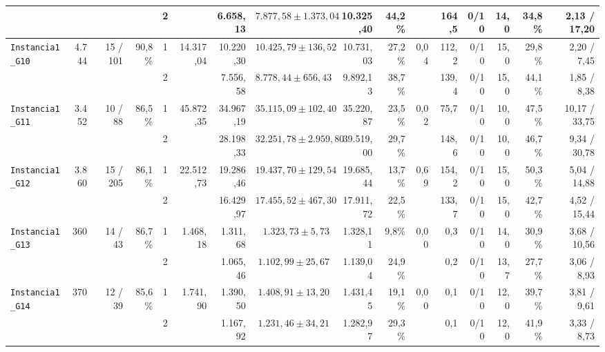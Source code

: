 {\begin{longtable}{lrrrcrrrrrrrrrrr}
& & & & 2 &  & 6.658,13 & $7.877,58 \pm 1.373,04$ & 10.325,40 & 44,2\% &  & 164,5 & 0/10 & 14,0 & 34,8\% & 2,13 / 17,20 \\
\midrule
\multirow{2}{*}{\texttt{Instancia1\_G10}} & \multirow{2}{*}{4.744} & \multirow{2}{*}{15 / 101} & \multirow{2}{*}{90,8\%} & 1 & \multirow{2}{*}{14.317,04} & 10.220,30 & $10.425,79 \pm 136,52$ & 10.731,03 & 27,2\% & \multirow{2}{*}{0,04} & 112,2 & 0/10 & 15,0 & 29,8\% & 2,20 / 7,45 \\
& & & & 2 &  & 7.556,58 & $8.778,44 \pm 656,43$ & 9.892,13 & 38,7\% &  & 139,4 & 0/10 & 15,0 & 44,1\% & 1,85 / 8,38 \\
\midrule
\multirow{2}{*}{\texttt{Instancia1\_G11}} & \multirow{2}{*}{3.452} & \multirow{2}{*}{10 / 88} & \multirow{2}{*}{86,5\%} & 1 & \multirow{2}{*}{45.872,35} & 34.967,19 & $35.115,09 \pm 102,40$ & 35.220,87 & 23,5\% & \multirow{2}{*}{0,02} & 75,7 & 0/10 & 10,0 & 47,5\% & 10,17 / 33,75 \\
& & & & 2 &  & 28.198,33 & $32.251,78 \pm 2.959,80$ & 39.519,00 & 29,7\% &  & 148,6 & 0/10 & 10,0 & 46,7\% & 9,34 / 30,78 \\
\midrule
\multirow{2}{*}{\texttt{Instancia1\_G12}} & \multirow{2}{*}{3.860} & \multirow{2}{*}{15 / 205} & \multirow{2}{*}{86,1\%} & 1 & \multirow{2}{*}{22.512,73} & 19.286,46 & $19.437,70 \pm 129,54$ & 19.685,44 & 13,7\% & \multirow{2}{*}{0,69} & 154,2 & 0/10 & 15,0 & 50,3\% & 5,04 / 14,88 \\
& & & & 2 &  & 16.429,97 & $17.455,52 \pm 467,30$ & 17.911,72 & 22,5\% &  & 133,7 & 0/10 & 15,0 & 42,7\% & 4,52 / 15,44 \\
\midrule
\multirow{2}{*}{\texttt{Instancia1\_G13}} & \multirow{2}{*}{360} & \multirow{2}{*}{14 / 43} & \multirow{2}{*}{86,7\%} & 1 & \multirow{2}{*}{1.468,18} & 1.311,68 & $1.323,73 \pm 5,73$ & 1.328,11 & 9,8\% & \multirow{2}{*}{0,00} & 0,3 & 0/10 & 14,0 & 30,9\% & 3,68 / 10,56 \\
& & & & 2 &  & 1.065,46 & $1.102,99 \pm 25,67$ & 1.139,04 & 24,9\% &  & 0,2 & 0/10 & 13,7 & 27,7\% & 3,06 / 8,93 \\
\midrule
\multirow{2}{*}{\texttt{Instancia1\_G14}} & \multirow{2}{*}{370} & \multirow{2}{*}{12 / 39} & \multirow{2}{*}{85,6\%} & 1 & \multirow{2}{*}{1.741,90} & 1.390,50 & $1.408,91 \pm 13,20$ & 1.431,45 & 19,1\% & \multirow{2}{*}{0,00} & 0,1 & 0/10 & 12,0 & 39,7\% & 3,81 / 9,61 \\
& & & & 2 &  & 1.167,92 & $1.231,46 \pm 34,21$ & 1.282,97 & 29,3\% &  & 0,1 & 0/10 & 12,0 & 41,9\% & 3,33 / 8,73 \\

\end{longtable}}
